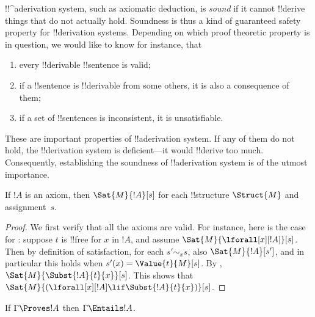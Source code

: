 \documentclass[../../include/open-logic-section]{subfiles}
\begin{document}

\begin{explain}
!!^a{derivation} system, such as axiomatic deduction, is \emph{sound}
if it cannot !!{derive} things that do not actually hold.  Soundness is
thus a kind of guaranteed safety property for !!{derivation} systems.
Depending on which proof theoretic property is in question, we would
like to know for instance, that
\begin{enumerate}
\item every !!{derivable} !!{sentence} is valid;
\item if a !!{sentence} is !!{derivable} from some others, it is also a
  consequence of them;
\item if a set of !!{sentence}s is inconsistent, it is unsatisfiable.
\end{enumerate}
These are important properties of !!a{derivation} system.  If any of them do
not hold, the !!{derivation} system is deficient---it would !!{derive} too much.
Consequently, establishing the soundness of !!a{derivation} system is of the
utmost importance.
\end{explain}

\begin{prop}
If $!A$ is an axiom, then $\Sat{M}{!A}[s]$ for each !!{structure}
$\Struct{M}$ and assignment~$s$.
\end{prop}

\begin{proof}
We first verify that all the axioms are
valid. For instance, here is the case for : suppose $t$ is
!!{free for} $x$ in $!A$, and assume
$\Sat{M}{\lforall[x][!A]}[s]$. Then by definition of satisfaction, for
each $s' \sim_x s$, also $\Sat{M}{!A}[s']$, and in particular this
holds when $s'(x) = \Value{t}{M}[s]$. By
,
$\Sat{M}{\Subst{!A}{t}{x}}[s]$. This shows that
$\Sat{M}{(\lforall[x][!A] \lif \Subst{!A}{t}{x})}[s]$.
\end{proof}

\begin{thm}[Soundness]
If $\Gamma \Proves !A$ then $\Gamma \Entails !A$.
\end{thm}
\end{document}
